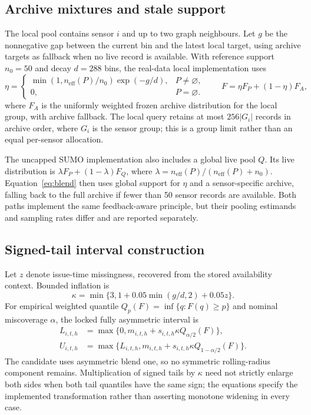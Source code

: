 \documentclass[pdflatex,sn-mathphys-num]{sn-jnl}
\begin{document}
\subsection{Archive mixtures and stale support}
The local pool contains sensor $i$ and up to two graph neighbours. Let $g$ be the nonnegative gap between the current bin and the latest local target, using archive targets as fallback when no live record is available. With reference support $n_0=50$ and decay $d=288$ bins, the real-data local implementation uses
\begin{equation}
\eta=\begin{cases}\min(1,n_{\mathrm{eff}}(P)/n_0)\exp(-g/d),&P\ne\varnothing,\\0,&P=\varnothing.\end{cases}
\qquad F=\eta F_P+(1-\eta)F_A,
\label{eq:blend}
\end{equation}
where $F_A$ is the uniformly weighted frozen archive distribution for the local group, with archive fallback. The local query retains at most $256|G_i|$ records in archive order, where $G_i$ is the sensor group; this is a group limit rather than an equal per-sensor allocation.

The uncapped SUMO implementation also includes a global live pool $Q$. Its live distribution is $\lambda F_P+(1-\lambda)F_Q$, where $\lambda=n_{\mathrm{eff}}(P)/(n_{\mathrm{eff}}(P)+n_0)$. Equation~\eqref{eq:blend} then uses global support for $\eta$ and a sensor-specific archive, falling back to the full archive if fewer than 50 sensor records are available. Both paths implement the same feedback-aware principle, but their pooling estimands and sampling rates differ and are reported separately.

\subsection{Signed-tail interval construction}
Let $z$ denote issue-time missingness, recovered from the stored availability context. Bounded inflation is
\begin{equation}
\kappa=\min\{3,1+0.05\min(g/d,2)+0.05z\}.
\end{equation}
For empirical weighted quantile $Q_p(F)=\inf\{q:F(q)\ge p\}$ and nominal miscoverage $\alpha$, the locked fully asymmetric interval is
\begin{align}
L_{i,t,h}&=\max\{0,m_{i,t,h}+s_{i,t,h}\kappa Q_{\alpha/2}(F)\},\\
U_{i,t,h}&=\max\{L_{i,t,h},m_{i,t,h}+s_{i,t,h}\kappa Q_{1-\alpha/2}(F)\}.
\label{eq:interval}
\end{align}
The candidate uses asymmetric blend one, so no symmetric rolling-radius component remains. Multiplication of signed tails by $\kappa$ need not strictly enlarge both sides when both tail quantiles have the same sign; the equations specify the implemented transformation rather than asserting monotone widening in every case.
\end{document}
